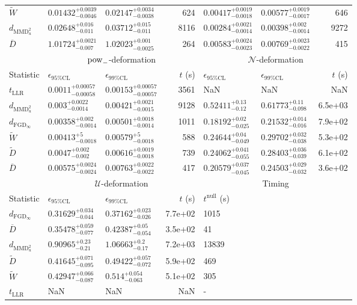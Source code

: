 \begin{tabular}{l|llr|llr}
	$\widetilde{W}$ & $0.01432_{-0.0046}^{+0.0039}$ & $0.02147_{-0.0038}^{+0.0034}$ & 624 & $0.00417_{-0.0018}^{+0.0019}$ & $0.00577_{-0.0017}^{+0.0019}$ & 646 \\
	$d_{\mathrm{MMD}^{2}_{u}}$ & $0.02648_{-0.011}^{+0.016}$ & $0.03712_{-0.011}^{+0.015}$ & 8116 & $0.00284_{-0.0014}^{+0.0021}$ & $0.00398_{-0.0014}^{+0.002}$ & 9272 \\
	$\overline{D}$ & $1.01724_{-0.007}^{+0.0021}$ & $1.02023_{-0.0025}^{+0.001}$ & 264 & $0.00583_{-0.0023}^{+0.0024}$ & $0.00769_{-0.0022}^{+0.0023}$ & 415 \\
	\toprule
	\multicolumn{1}{c}{} & \multicolumn{3}{c}{$\rm{pow}_{-}$-deformation} & \multicolumn{3}{c}{$\mathcal{N}$-deformation} \\
	Statistic & $\epsilon_{95\%\mathrm{CL}}$ & $\epsilon_{99\%\mathrm{CL}}$ & $t$ (s) & $\epsilon_{95\%\mathrm{CL}}$ & $\epsilon_{99\%\mathrm{CL}}$ & $t$ (s) \\
	\midrule
	$t_{\mathrm{LLR}}$ & $0.0011_{-0.00058}^{+0.00057}$ & $0.00153_{-0.00057}^{+0.00057}$ & 3561 & NaN & NaN & NaN \\
	$d_{\mathrm{MMD}^{2}_{u}}$ & $0.003_{-0.0014}^{+0.0022}$ & $0.00421_{-0.0015}^{+0.0021}$ & 9128 & $0.52411_{-0.12}^{+0.13}$ & $0.61773_{-0.098}^{+0.11}$ & 6.5e+03 \\
	$d_{\mathrm{FGD}_{\infty}}$ & $0.00358_{-0.0014}^{+0.002}$ & $0.00501_{-0.0014}^{+0.0018}$ & 1011 & $0.18192_{-0.025}^{+0.02}$ & $0.21532_{-0.016}^{+0.014}$ & 7.9e+02 \\
	$\widetilde{W}$ & $0.00413_{-0.0018}^{+5}$ & $0.00579_{-0.0018}^{+5}$ & 588 & $0.24644_{-0.049}^{+0.04}$ & $0.29702_{-0.038}^{+0.032}$ & 5.3e+02 \\
	$\widetilde{D}$ & $0.0047_{-0.002}^{+0.002}$ & $0.00616_{-0.0018}^{+0.0019}$ & 739 & $0.24062_{-0.055}^{+0.041}$ & $0.28403_{-0.039}^{+0.036}$ & 6.1e+02 \\
	$\overline{D}$ & $0.00575_{-0.0024}^{+0.0024}$ & $0.00763_{-0.0022}^{+0.0022}$ & 417 & $0.20579_{-0.045}^{+0.037}$ & $0.24503_{-0.032}^{+0.029}$ & 3.6e+02 \\
	\toprule
	\multicolumn{1}{c}{} & \multicolumn{3}{c}{$\mathcal{U}$-deformation} & \multicolumn{3}{c}{Timing} \\
	Statistic & $\epsilon_{95\%\mathrm{CL}}$ & $\epsilon_{99\%\mathrm{CL}}$ & $t$ (s) & $t^{\mathrm{null}}$ (s) \\
	\midrule
	$d_{\mathrm{FGD}_{\infty}}$ & $0.31629_{-0.044}^{+0.034}$ & $0.37162_{-0.026}^{+0.023}$ & 7.7e+02 & 1015 \\
	$\overline{D}$ & $0.35478_{-0.077}^{+0.059}$ & $0.42387_{-0.054}^{+0.05}$ & 3.5e+02 & 41 \\
	$d_{\mathrm{MMD}^{2}_{u}}$ & $0.90965_{-0.21}^{+0.23}$ & $1.06663_{-0.17}^{+0.2}$ & 7.2e+03 & 13839 \\
	$\widetilde{D}$ & $0.41645_{-0.095}^{+0.071}$ & $0.49422_{-0.072}^{+0.057}$ & 5.9e+02 & 469 \\
	$\widetilde{W}$ & $0.42947_{-0.087}^{+0.066}$ & $0.514_{-0.063}^{+0.054}$ & 5.1e+02 & 305 \\
	$t_{\mathrm{LLR}}$ & NaN & NaN & NaN & - \\
	\bottomrule
\end{tabular}